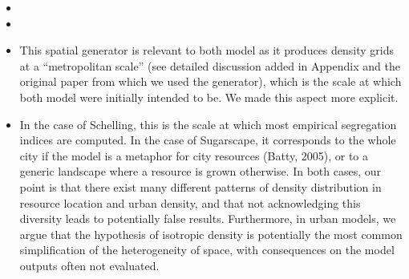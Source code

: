 \documentclass[11pt,a4paper,sans]{moderncv}        %
\begin{document}
\begin{itemize}
	
	\item {}
	
	\item {}
	
	\item This spatial generator is relevant to both model as it produces density grids at a ``metropolitan scale'' (see detailed discussion added in Appendix and the original paper from which we used the generator), which is the scale at which both model were initially intended to be. We made this aspect more explicit. 
	
	\item In the case of Schelling, this is the scale at which most empirical segregation indices are computed. In the case of Sugarscape, it corresponds to the whole city if the model is a metaphor for city resources (Batty, 2005), or to a generic landscape where a resource is grown otherwise. In both cases, our point is that there exist many different patterns of density distribution in resource location and urban density, and that not acknowledging this diversity leads to potentially false results. Furthermore, in urban models, we argue that the hypothesis of isotropic density is potentially the most common simplification of the heterogeneity of space, with consequences on the model outputs often not evaluated.
	

\end{itemize}
\end{document}
